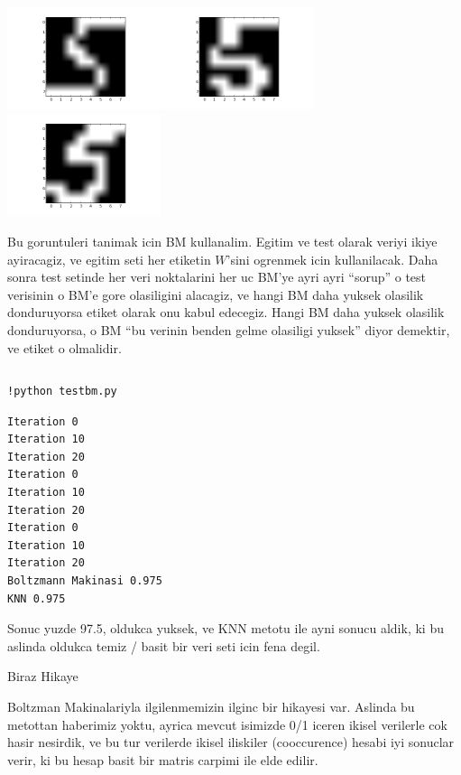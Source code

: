 \documentclass[12pt,fleqn]{article}\usepackage{../common}
\begin{document}
\includegraphics[height=3cm]{boltzmann_01.png}\includegraphics[height=3cm]{boltzmann_02.png}\includegraphics[height=3cm]{boltzmann_03.png}


Bu goruntuleri tanimak icin BM kullanalim. Egitim ve test olarak veriyi
ikiye ayiracagiz, ve egitim seti her etiketin $W$'sini ogrenmek icin
kullanilacak. Daha sonra test setinde her veri noktalarini her uc BM'ye
ayri ayri ``sorup'' o test verisinin o BM'e gore olasiligini alacagiz, ve
hangi BM daha yuksek olasilik donduruyorsa etiket olarak onu kabul
edecegiz. Hangi BM daha yuksek olasilik donduruyorsa, o BM ``bu verinin
benden gelme olasiligi yuksek'' diyor demektir, ve etiket o olmalidir.

\inputminted[fontsize=\footnotesize]{python}{testbm.py}

\begin{verbatim}
!python testbm.py
\end{verbatim}

\begin{verbatim}
Iteration 0
Iteration 10
Iteration 20
Iteration 0
Iteration 10
Iteration 20
Iteration 0
Iteration 10
Iteration 20
Boltzmann Makinasi 0.975
KNN 0.975
\end{verbatim}

Sonuc yuzde 97.5, oldukca yuksek, ve KNN metotu ile ayni sonucu aldik, ki
bu aslinda oldukca temiz / basit bir veri seti icin fena degil.

Biraz Hikaye

Boltzman Makinalariyla ilgilenmemizin ilginc bir hikayesi var. Aslinda bu
metottan haberimiz yoktu, ayrica mevcut isimizde 0/1 iceren ikisel
verilerle cok hasir nesirdik, ve bu tur verilerde ikisel iliskiler
(cooccurence) hesabi iyi sonuclar verir, ki bu hesap basit bir matris
carpimi ile elde edilir.
\end{document}
